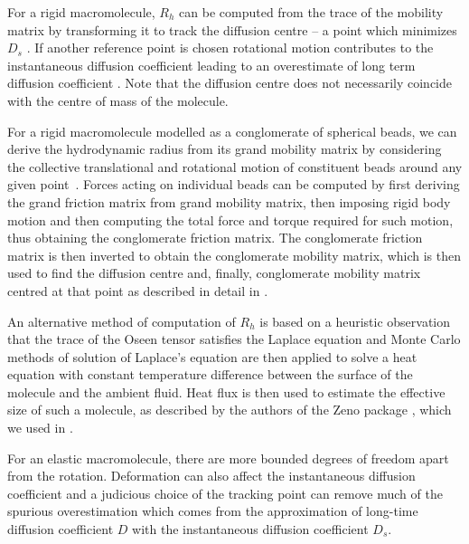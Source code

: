 \documentclass{doctoral}
\begin{document}
For a rigid macromolecule, $R_h$ can be computed from the trace of the mobility matrix by transforming it to track the diffusion centre -- a point which minimizes $D_{s}$ \cite{Zuk_2018}.
If another reference point is chosen rotational motion contributes to the instantaneous diffusion coefficient leading to an overestimate of long term diffusion coefficient \cite{Cichocki_2015}.
Note that the diffusion centre does not necessarily coincide with the centre of mass of the molecule.

For a rigid macromolecule modelled as a conglomerate of spherical beads, we can derive the hydrodynamic radius from its grand mobility matrix by considering the collective translational and rotational motion of constituent beads around any given point~\cite{Ekiel-Jezewska_2009}.
Forces acting on individual beads can be computed by first deriving the grand friction matrix from grand mobility matrix, then imposing rigid body motion and then computing the total force and torque required for such motion, thus obtaining the conglomerate friction matrix.
The conglomerate friction matrix is then inverted to obtain the conglomerate mobility matrix, which is then used to find the diffusion centre and, finally,  conglomerate mobility matrix centred at that point as described in detail in \textcite{Cichocki_2019}.

An alternative method of computation of $R_h$ is based on a heuristic observation that the trace of the Oseen tensor satisfies the Laplace equation and Monte Carlo methods of solution of Laplace's equation are then applied to solve a heat equation with constant temperature difference between the surface of the molecule and the ambient fluid.
Heat flux is then used to estimate the effective size of such a molecule, as described by the authors of the Zeno package \cite{Juba_2017}, which we used in \textcite{Waszkiewicz_2023_dna}.

For an elastic macromolecule, there are more bounded degrees of freedom apart from the rotation.
Deformation can also affect the instantaneous diffusion coefficient and a judicious choice of the tracking point can remove much of the spurious overestimation which comes from the approximation of long-time diffusion coefficient $D$ with the instantaneous diffusion coefficient $D_{s}$.
\end{document}
